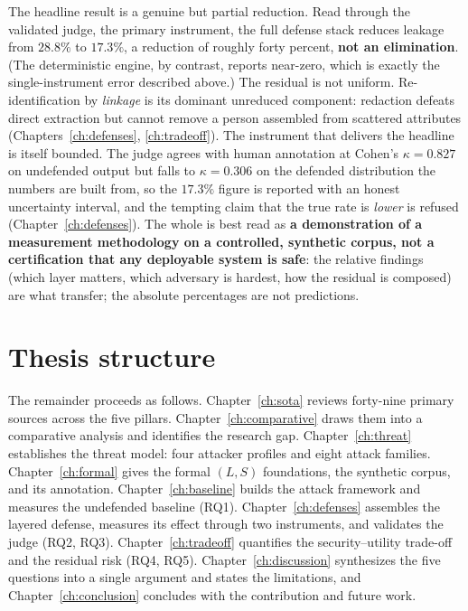 \documentclass[12pt,a4paper]{report}
\begin{document}
The headline result is a genuine but partial reduction. Read through the validated judge, the
primary instrument, the full defense stack reduces leakage from $28.8\%$ to $17.3\%$, a reduction
of roughly forty percent, \textbf{not an elimination}. (The deterministic engine, by contrast,
reports near-zero, which is exactly the single-instrument error described above.) The residual is
not uniform. Re-identification by \emph{linkage} is its dominant unreduced component: redaction
defeats direct extraction but cannot remove a person assembled from scattered attributes
(Chapters~\ref{ch:defenses}, \ref{ch:tradeoff}). The instrument that delivers the headline is
itself bounded. The judge agrees with human annotation at Cohen's $\kappa = 0.827$ on undefended
output but falls to $\kappa = 0.306$ on the defended distribution the numbers are built from, so
the $17.3\%$ figure is reported with an honest uncertainty interval, and the tempting claim that
the true rate is \emph{lower} is refused (Chapter~\ref{ch:defenses}). The whole is best read as
\textbf{a demonstration of a measurement methodology on a controlled, synthetic corpus, not a
certification that any deployable system is safe}: the relative findings (which layer matters,
which adversary is hardest, how the residual is composed) are what transfer; the absolute
percentages are not predictions.

\section{Thesis structure}
\label{sec:intro-structure}

The remainder proceeds as follows. Chapter~\ref{ch:sota} reviews forty-nine primary sources
across the five pillars. Chapter~\ref{ch:comparative} draws them into a comparative analysis and
identifies the research gap. Chapter~\ref{ch:threat} establishes the threat
model: four attacker profiles and eight attack families. Chapter~\ref{ch:formal} gives the
formal $(L,S)$ foundations, the synthetic corpus, and its annotation. Chapter~\ref{ch:baseline} builds the attack framework and measures the
undefended baseline (RQ1). Chapter~\ref{ch:defenses} assembles the layered defense, measures its
effect through two instruments, and validates the judge (RQ2, RQ3). Chapter~\ref{ch:tradeoff}
quantifies the security--utility trade-off and the residual risk (RQ4, RQ5).
Chapter~\ref{ch:discussion} synthesizes the five questions into a single argument and states the
limitations, and Chapter~\ref{ch:conclusion} concludes with the contribution and future work.
\end{document}
